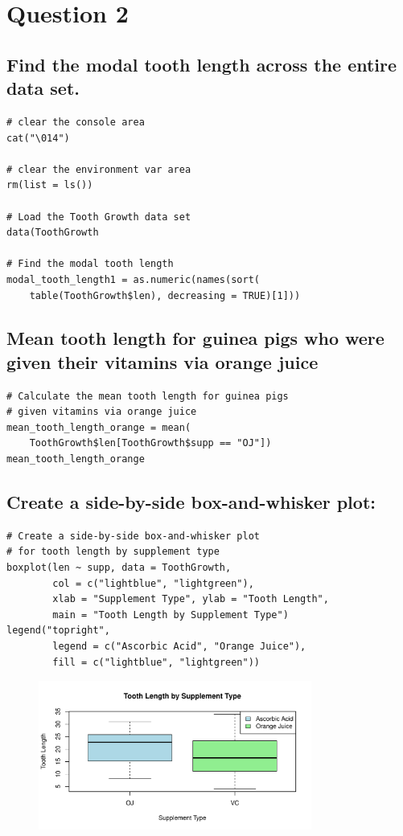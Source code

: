 \section{Question 2}
\subsection{Find the modal tooth length across the entire data set.}
\begin{lstlisting}
# clear the console area
cat("\014")

# clear the environment var area
rm(list = ls())

# Load the Tooth Growth data set
data(ToothGrowth

# Find the modal tooth length
modal_tooth_length1 = as.numeric(names(sort(
    table(ToothGrowth$len), decreasing = TRUE)[1]))
\end{lstlisting}
% 
\subsection{Mean tooth length for guinea pigs who were given their vitamins via orange juice}
% 
\begin{lstlisting}
# Calculate the mean tooth length for guinea pigs 
# given vitamins via orange juice
mean_tooth_length_orange = mean(
    ToothGrowth$len[ToothGrowth$supp == "OJ"])
mean_tooth_length_orange    
\end{lstlisting}
% 
\subsection{Create a side-by-side box-and-whisker plot:}
% 
\begin{lstlisting}
# Create a side-by-side box-and-whisker plot
# for tooth length by supplement type
boxplot(len ~ supp, data = ToothGrowth, 
        col = c("lightblue", "lightgreen"),
        xlab = "Supplement Type", ylab = "Tooth Length",
        main = "Tooth Length by Supplement Type")
legend("topright", 
        legend = c("Ascorbic Acid", "Orange Juice"), 
        fill = c("lightblue", "lightgreen"))
\end{lstlisting}
% 
% 
\begin{figure}[H]
    \centering
    \includegraphics[width=0.8\textwidth]{img/ToothLength.pdf}
\end{figure}
% 
% 
